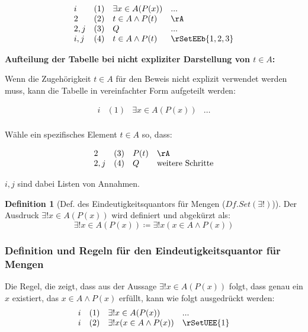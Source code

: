 \documentclass{book}
\theoremstyle{plain}
\theoremstyle{remark}
\theoremstyle{definition}
\newtheorem{definition}{Definition}[section]
\begin{document}
\[
\begin{array}{llll}
	i & (1) & \exists x \in A(P(x)) & ... \\
	2 & (2) & t\in A\land P(t) & \rA \\
	2,j & (3) & Q & ... \\
	i,j & (4) & t\in A\land P(t) & \rSetEEb{1,2,3} \\
\end{array}
\]

\textbf{Aufteilung der Tabelle bei nicht expliziter Darstellung von \(t \in A\):}

Wenn die Zugehörigkeit \(t \in A\) für den Beweis nicht explizit verwendet werden muss, kann die Tabelle in vereinfachter Form aufgeteilt werden:

\[
\begin{array}{llll}
	i & (1) & \exists x \in A(P(x)) & \dots \\
\end{array}
\]

Wähle ein spezifisches Element \(t \in A\) so, dass:

\[
\begin{array}{llll}
	2 & (3) & P(t) & \rA \\
      2,j & (4) & Q & \text{weitere Schritte} \\
\end{array}
\]


\(i, j\) sind dabei Listen von Annahmen. 

\begin{definition}[Def. des Eindeutigkeitsquantors für Mengen (\(Df. Set(\exists !)\))]
	Der Ausdruck \(\exists ! x \in A(P(x))\) wird definiert und abgekürzt als:
	\[
	\exists ! x \in A(P(x)) \coloneqq \exists! x (x \in A \wedge P(x))
	\]
\end{definition}

\subsubsection{Definition und Regeln für den Eindeutigkeitsquantor für Mengen}
\label{rule:rSetUEI} \label{rule:rSetUEE}


Die Regel, die zeigt, dass aus der Aussage \(\exists ! x \in A(P(x))\) folgt, dass genau ein \(x\) existiert, das \(x \in A \land P(x)\) erfüllt, kann wie folgt ausgedrückt werden:
\[
\begin{array}{llll}
	i & (1) & \exists ! x \in A(P(x)) & ... \\
	i & (2) & \exists !x(x\in A\land P(x)) & \rSetUEE{1} \\
\end{array}
\]
\end{document}
